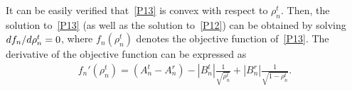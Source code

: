 \documentclass[12pt, draftclsnofoot, onecolumn]{IEEEtran}
\begin{document}
It can be easily verified that~\eqref{P13} is convex with respect to $\rho_n^t$. Then, the solution to~\eqref{P13} (as well as the solution to~\eqref{P12}) can be obtained by solving ${{d {f_{n}}} \mathord{\left/
{\vphantom {{d {f_{n}}} {d {\rho_n^t}}}} \right.\kern-\nulldelimiterspace} {d {\rho_n^t}}}=0$, where $f_{n}\left(\rho_n^t\right)$ denotes the objective function of~\eqref{P13}. The derivative of the objective function can be expressed as 
\begin{equation}\label{derivative}
\begin{aligned}
f_{n}'\left(\rho_n^t\right)=\left(A_n^t-A_n^r\right)-\left|B_n^t\right|\frac{1}{\sqrt{\rho_n^t}}+\left|B_n^r\right|\frac{1}{\sqrt{1-\rho_n^t}}.
\end{aligned}
\end{equation}
\end{document}
